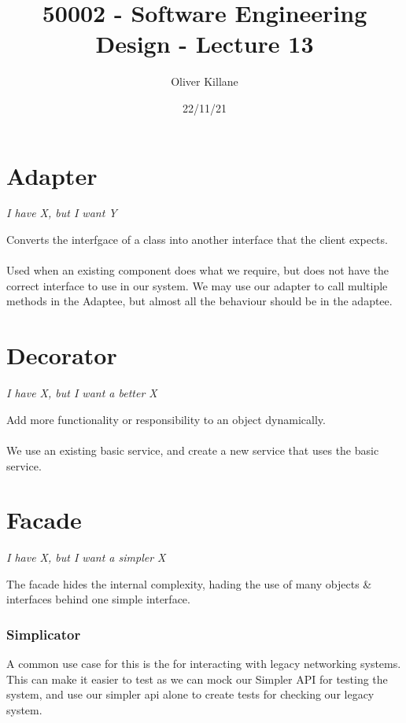 \documentclass{report}
\title{50002 - Software Engineering Design - Lecture 13}
\author{Oliver Killane}
\date{22/11/21}
\begin{document}
    \maketitle

    \section*{Adapter}
        \centerline{\textit{I have X, but I want Y}}
        Converts the interfgace of a class into another interface that the client expects.
        \\
        \\ Used when an existing component does what we require, but does not have the correct interface to use in our system. We may use our adapter to call multiple methods in the Adaptee, but almost all the behaviour should be in the adaptee.
        
    \section*{Decorator}
        \centerline{\textit{I have X, but I want a better X}}
        Add more functionality or responsibility to an object dynamically.
        \\
        \\ We use an existing basic service, and create a new service that uses the basic service.

    \section*{Facade}
        \centerline{\textit{I have X, but I want a simpler X}}
        The facade hides the internal complexity, hading the use of many objects \& interfaces  behind one simple interface.
        \subsubsection*{Simplicator}
            A common use case for this is the  for interacting with legacy networking systems.
            This can make it easier to test as we can mock our Simpler API for testing the system, and use our simpler api alone to create tests for checking our legacy system.
\end{document}
